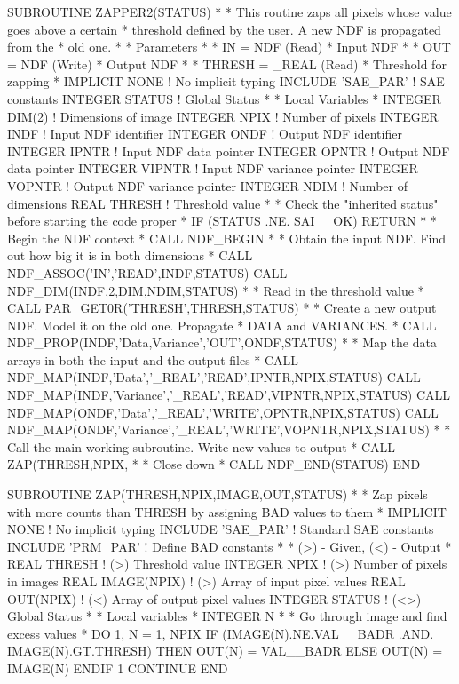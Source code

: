 \documentclass[11pt,nolof]{starlink}
\begin{document}
\begin{small}
\begin{terminalv}
      SUBROUTINE ZAPPER2(STATUS)
*
* This routine zaps all pixels whose value goes above a certain
* threshold defined by the user. A new NDF is propagated from the
* old one.
*
* Parameters
*
* IN = NDF (Read)
*  Input NDF
*
* OUT = NDF (Write)
*  Output NDF
*
* THRESH = _REAL (Read)
*  Threshold for zapping
*
      IMPLICIT NONE     ! No implicit typing
      INCLUDE 'SAE_PAR' ! SAE constants
      INTEGER STATUS    ! Global Status
*
* Local Variables
*
      INTEGER DIM(2)    ! Dimensions of image
      INTEGER NPIX      ! Number of pixels
      INTEGER INDF      ! Input NDF identifier
      INTEGER ONDF      ! Output NDF identifier
      INTEGER IPNTR     ! Input NDF data pointer
      INTEGER OPNTR     ! Output NDF data pointer
      INTEGER VIPNTR    ! Input NDF variance pointer
      INTEGER VOPNTR    ! Output NDF variance pointer
      INTEGER NDIM      ! Number of dimensions
      REAL THRESH       ! Threshold value
*
* Check the "inherited status" before starting the code proper
*
      IF (STATUS .NE. SAI__OK) RETURN
*
* Begin the NDF context
*
      CALL NDF_BEGIN
*
* Obtain the input NDF. Find out how big it is in both dimensions
*
      CALL NDF_ASSOC('IN','READ',INDF,STATUS)
      CALL NDF_DIM(INDF,2,DIM,NDIM,STATUS)
*
* Read in the threshold value
*
      CALL PAR_GET0R('THRESH',THRESH,STATUS)
*
* Create a new output NDF. Model it on the old one. Propagate
* DATA and VARIANCES.
*
      CALL NDF_PROP(INDF,'Data,Variance','OUT',ONDF,STATUS)
*
* Map the data arrays in both the input and the output files
*
      CALL NDF_MAP(INDF,'Data','_REAL','READ',IPNTR,NPIX,STATUS)
      CALL NDF_MAP(INDF,'Variance','_REAL','READ',VIPNTR,NPIX,STATUS)
      CALL NDF_MAP(ONDF,'Data','_REAL','WRITE',OPNTR,NPIX,STATUS)
      CALL NDF_MAP(ONDF,'Variance','_REAL','WRITE',VOPNTR,NPIX,STATUS)
*
* Call the main working subroutine. Write new values to output
*
      CALL ZAP(THRESH,NPIX,%
*
* Close down
*
      CALL NDF_END(STATUS)
      END

      SUBROUTINE ZAP(THRESH,NPIX,IMAGE,OUT,STATUS)
*
* Zap pixels with more counts than THRESH by assigning BAD values to them
*
      IMPLICIT NONE       ! No implicit typing
      INCLUDE 'SAE_PAR'   ! Standard SAE constants
      INCLUDE 'PRM_PAR'   ! Define BAD constants
*
* (>) - Given,  (<) - Output
*
      REAL THRESH         ! (>) Threshold value
      INTEGER NPIX        ! (>) Number of pixels in images
      REAL IMAGE(NPIX)    ! (>) Array of input pixel values
      REAL OUT(NPIX)      ! (<) Array of output pixel values
      INTEGER STATUS      ! (<>) Global Status
*
* Local variables
*
      INTEGER N
*
* Go through image and find excess values
*
      DO 1, N = 1, NPIX
        IF (IMAGE(N).NE.VAL__BADR .AND. IMAGE(N).GT.THRESH) THEN
          OUT(N) = VAL__BADR
        ELSE
          OUT(N) = IMAGE(N)
        ENDIF
 1    CONTINUE
      END
\end{terminalv}
\end{small}
\end{document}
